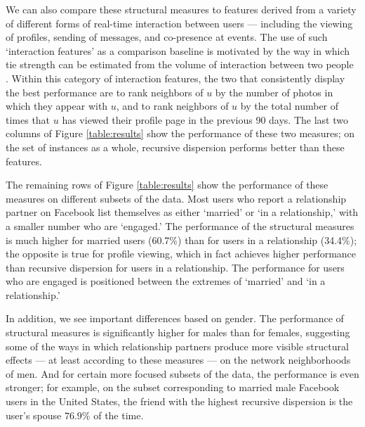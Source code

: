 \documentclass{sigchi}
\begin{document}
We can also compare these structural measures to features derived
from a variety of different forms of real-time interaction between users --- 
including the viewing of profiles, sending of messages, 
and co-presence at events.
The use of such `interaction features' as a comparison baseline is
motivated by the way in which tie strength can be estimated from 
the volume of interaction between two 
people
\cite{eagle-inferring-friendship,jones-tie-strength}.
Within this category of interaction features,
the two that consistently display
the best performance are to rank 
neighbors of $u$ by the number of photos in which they appear with $u$,
and to rank neighbors of $u$ by the total number of times that
$u$ has viewed their profile page in the previous 90 days.
The last two columns of Figure \ref{table:results} show
the performance of these two measures;
on the set of instances as a whole, recursive dispersion performs
better than these features.

The remaining rows of Figure \ref{table:results}
show the performance of these measures on different subsets
of the data.
Most users who report a relationship partner on Facebook list themselves
as either `married' or `in a relationship,' with a smaller number who are
`engaged.'
The performance of the structural measures is much higher for
married users (60.7\%) than for users in a relationship (34.4\%);
the opposite is true for profile viewing, which in fact achieves
higher performance than recursive dispersion for users
in a relationship.
The performance for users who are engaged is positioned
between the extremes of `married' and `in a relationship.'

In addition, we see important differences based on gender.
The performance of structural measures is significantly higher
for males than for females, suggesting some of the ways
in which relationship partners produce more visible
structural effects --- at least according to these measures ---
on the network neighborhoods of men.
And for certain more focused
subsets of the data, the performance is even stronger;
for example, on the subset corresponding to
married male Facebook users in the United States,
the friend with the highest recursive dispersion is the user's
spouse $76.9\%$ of the time.
\end{document}
